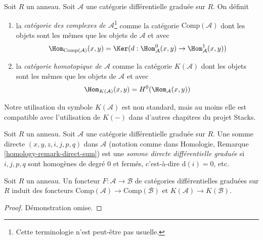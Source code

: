 \begin{definition}
\label{definition-homotopy-category-of-dga-category}
Soit $R$ un anneau. Soit $\mathcal{A}$ une catégorie différentielle graduée sur
$R$. On définit
\begin{enumerate}
\item la {\it catégorie des complexes de $\mathcal{A}$}\footnote{Cette terminologie n'est peut-être pas usuelle.} comme la catégorie $\text{Comp}(\mathcal{A})$ dont
les objets sont les mêmes que les objets de $\mathcal{A}$ et avec
$$
\Hom_{\text{Comp}(\mathcal{A})}(x, y) =
\Ker(d : \Hom^0_\mathcal{A}(x, y) \to \Hom^1_\mathcal{A}(x, y))
$$
\item la {\it catégorie homotopique de $\mathcal{A}$} comme la catégorie
$K(\mathcal{A})$ dont les objets sont les mêmes que les objets de $\mathcal{A}$ et
avec
$$
\Hom_{K(\mathcal{A})}(x, y) = H^0(\Hom_\mathcal{A}(x, y))
$$
\end{enumerate}
\end{definition}

\noindent
Notre utilisation du symbole $K(\mathcal{A})$ est non standard, mais au moins elle
est compatible avec l'utilisation de $K(-)$ dans d'autres chapitres du projet
Stacks.

\begin{definition}
\label{definition-dg-direct-sum}
Soit $R$ un anneau. Soit $\mathcal{A}$ une catégorie différentielle graduée sur
$R$. Une somme directe $(x, y, z, i, j, p, q)$ dans $\mathcal{A}$ (notation comme
dans Homologie, Remarque \ref{homology-remark-direct-sum}) est une {\it somme
directe différentielle graduée} si $i, j, p, q$ sont homogènes de degré $0$ et
fermés, c'est-à-dire $\text{d}(i) = 0$, etc.
\end{definition}

\begin{lemma}
\label{lemma-functorial}
Soit $R$ un anneau. Un foncteur $F : \mathcal{A} \to \mathcal{B}$ de catégories
différentielles graduées sur $R$ induit des foncteurs $\text{Comp}(\mathcal{A})
\to \text{Comp}(\mathcal{B})$ et $K(\mathcal{A}) \to K(\mathcal{B})$.
\end{lemma}

\begin{proof}
Démonstration omise.
\end{proof}

